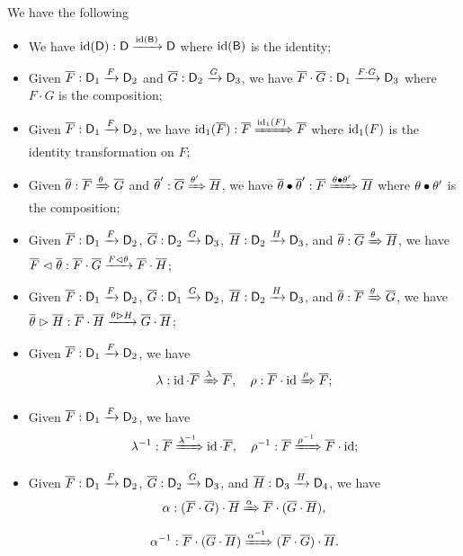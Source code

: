 \begin{example}
We have the following
\begin{itemize}
	\item We have $\id(\D) : \disppsfun{\D}{\D}{\id(\B)}$
	where $\id(\B)$ is the identity;
	\item Given $\FF : \disppsfun{\D_1}{\D_2}{F}$ and $\GG : \disppsfun{\D_2}{\D_3}{G}$,
	we have $\FF \cdot \GG : \disppsfun{\D_1}{\D_3}{F \cdot G}$
	where $F \cdot G$ is the composition;
	\item Given $\FF : \disppsfun{\D_1}{\D_2}{F}$,
	we have $\id_1(\FF) : \disppstrans{\FF}{\FF}{\id_1(F)}$
	where $\id_1(F)$ is the identity transformation on $F$;
	\item Given $\thetatheta : \disppstrans{\FF}{\GG}{\theta}$ and $\thetatheta' : \disppstrans{\GG}{\HH}{\theta'}$,
	we have $\thetatheta \vcomp \thetatheta' : \disppstrans{\FF}{\HH}{\theta \vcomp \theta'}$
	where $\theta \vcomp \theta'$ is the composition;
	\item Given $\FF : \disppsfun{\D_1}{\D_2}{F}$, $\GG : \disppsfun{\D_2}{\D_3}{G}$, $\HH : \disppsfun{\D_2}{\D_3}{H}$, and $\thetatheta : \disppstrans{\GG}{\HH}{\theta}$,
	we have $\FF \whiskerl \thetatheta : \disppsfun{\FF \cdot \GG}{\FF \cdot \HH}{F \whiskerl \theta}$;
	\item Given $\FF : \disppsfun{\D_1}{\D_2}{F}$, $\GG : \disppsfun{\D_1}{\D_2}{G}$, $\HH : \disppsfun{\D_2}{\D_3}{H}$, and $\thetatheta : \disppstrans{\FF}{\GG}{\theta}$,
	we have $\thetatheta \whiskerr \HH : \disppsfun{\FF \cdot \HH}{\GG \cdot \HH}{\theta \whiskerr H}$;
	\item Given $\FF : \disppsfun{\D_1}{\D_2}{F}$,
	we have
	\[
	\lunitor{\FF} : \disppstrans{\id \cdot \FF}{\FF}{\lunitor{F}}, \quad
	\runitor{\FF} : \disppstrans{\FF \cdot \id}{\FF}{\runitor{\FF}};
	\]
	\item Given $\FF : \disppsfun{\D_1}{\D_2}{F}$,
	we have
	\[
	\linvunitor{\FF} : \disppstrans{\FF}{\id \cdot \FF}{\linvunitor{F}}, \quad
	\rinvunitor{\FF} : \disppstrans{\FF}{\FF \cdot \id}{\rinvunitor{\FF}};
	\]
	\item Given $\FF : \disppsfun{\D_1}{\D_2}{F}$, $\GG : \disppsfun{\D_2}{\D_3}{G}$, and $\HH : \disppsfun{\D_3}{\D_4}{H}$,
	we have
	\[
	\lassoc{\FF}{\GG}{\HH} : \disppstrans{(\FF \cdot \GG) \cdot \HH}{\FF \cdot (\GG \cdot \HH)}{\lassoc{F}{G}{H}},
	\]
	\[
	\rassoc{\FF}{\GG}{\HH} : \disppstrans{\FF \cdot (\GG \cdot \HH)}{(\FF \cdot \GG) \cdot \HH}{\rassoc{F}{G}{H}}.
	\]
\end{itemize}
\end{example}

